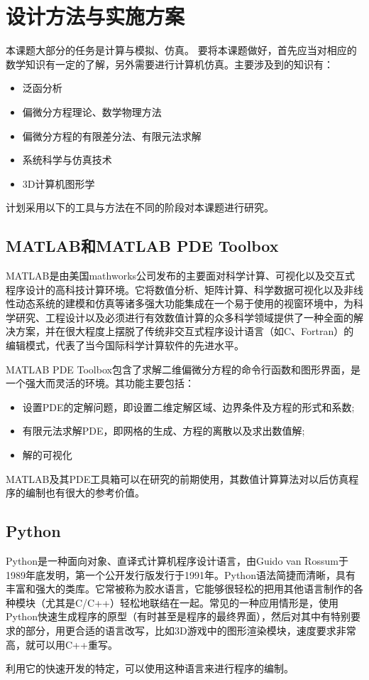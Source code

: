 \documentclass[a4paper,cs4size,adobefonts,fancyhdr]{ctexart}[2005/11/25]
\newcommand{\upcite}[1]{\textsuperscript{\textsuperscript{\cite{#1}}}}
\numberwithin{equation}{section} %
\begin{document}
\section{设计方法与实施方案}
本课题大部分的任务是计算与模拟、仿真。
要将本课题做好，首先应当对相应的数学知识有一定的了解\upcite{SHUXUEWULI}，另外需要进行计算机仿真。主要涉及到的知识有：
\begin{itemize}\setlength{\itemsep}{0em}
\item 泛函分析
\item 偏微分方程理论、数学物理方法
\item 偏微分方程的有限差分法、有限元法求解
\item 系统科学与仿真技术
\item 3D计算机图形学
\end{itemize}\par
计划采用以下的工具与方法在不同的阶段对本课题进行研究。
\subsection{MATLAB和MATLAB PDE Toolbox}
MATLAB是由美国mathworks公司发布的主要面对科学计算、可视化以及交互式程序设计的高科技计算环境。它将数值分析、矩阵计算、科学数据可视化以及非线性动态系统的建模和仿真等诸多强大功能集成在一个易于使用的视窗环境中，为科学研究、工程设计以及必须进行有效数值计算的众多科学领域提供了一种全面的解决方案，并在很大程度上摆脱了传统非交互式程序设计语言（如C、Fortran）的编辑模式，代表了当今国际科学计算软件的先进水平。\par
MATLAB PDE Toolbox包含了求解二维偏微分方程的命令行函数和图形界面，是一个强大而灵活的环境。其功能主要包括：
\begin{itemize}\setlength{\itemsep}{0em}
\item 设置PDE的定解问题，即设置二维定解区域、边界条件及方程的形式和系数;
\item 有限元法求解PDE，即网格的生成、方程的离散以及求出数值解;
\item 解的可视化
\end{itemize}\par
MATLAB及其PDE工具箱可以在研究的前期使用，其数值计算算法对以后仿真程序的编制也有很大的参考价值。
\subsection{Python}
Python是一种面向对象、直译式计算机程序设计语言，由Guido van Rossum于1989年底发明，第一个公开发行版发行于1991年。Python语法简捷而清晰，具有丰富和强大的类库。它常被称为胶水语言，它能够很轻松的把用其他语言制作的各种模块（尤其是C/C++）轻松地联结在一起。常见的一种应用情形是，使用Python快速生成程序的原型（有时甚至是程序的最终界面），然后对其中有特别要求的部分，用更合适的语言改写，比如3D游戏中的图形渲染模块，速度要求非常高，就可以用C++重写。\par
利用它的快速开发的特定，可以使用这种语言来进行程序的编制。
\end{document}
